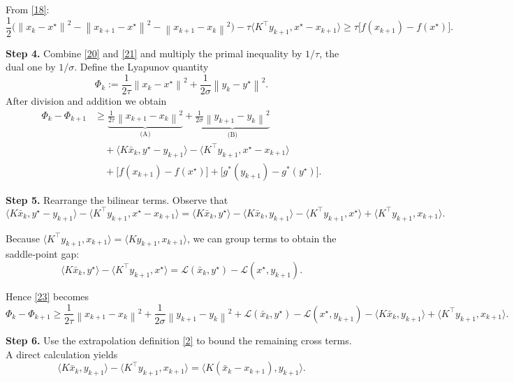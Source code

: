 \documentclass{article}
\newcommand{\inner}[2]{\langle #1,#2\rangle}
\newcommand{\norm}[1]{\left\|#1\right\|}
\begin{document}
From \eqref{18}:
\[
\frac{1}{2}\bigl(\norm{x_{k}-x^{\star}}^{2}
-\norm{x_{k+1}-x^{\star}}^{2}
-\norm{x_{k+1}-x_{k}}^{2}\bigr)
- \tau\inner{K^{\top}y_{k+1}}{x^{\star}-x_{k+1}}
\ge \tau\bigl[f(x_{k+1})-f(x^{\star})\bigr].
\tag{21}
\]

\medskip

\noindent\textbf{Step 4.}  Combine \eqref{20} and \eqref{21} and multiply the primal inequality by $1/\tau$, the dual one by $1/\sigma$.
Define the Lyapunov quantity
\[
\Phi_{k}:=\frac{1}{2\tau}\norm{x_{k}-x^{\star}}^{2}
+\frac{1}{2\sigma}\norm{y_{k}-y^{\star}}^{2}.
\tag{22}
\]
After division and addition we obtain
\[
\begin{aligned}
\Phi_{k}-\Phi_{k+1}
&\ge
\underbrace{\frac{1}{2\tau}\norm{x_{k+1}-x_{k}}^{2}}_{\text{(A)}}
+\underbrace{\frac{1}{2\sigma}\norm{y_{k+1}-y_{k}}^{2}}_{\text{(B)}}
\\
&\quad
+\inner{K\bar{x}_{k}}{y^{\star}-y_{k+1}}
-\inner{K^{\top}y_{k+1}}{x^{\star}-x_{k+1}}
\\
&\quad
+ \bigl[f(x_{k+1})-f(x^{\star})\bigr]
+ \bigl[g^{*}(y_{k+1})-g^{*}(y^{\star})\bigr].
\end{aligned}
\tag{23}
\]

\medskip

\noindent\textbf{Step 5.}  Rearrange the bilinear terms.
Observe that
\[
\inner{K\bar{x}_{k}}{y^{\star}-y_{k+1}}
-\inner{K^{\top}y_{k+1}}{x^{\star}-x_{k+1}}
= \inner{K\bar{x}_{k}}{y^{\star}}-\inner{K\bar{x}_{k}}{y_{k+1}}
-\inner{K^{\top}y_{k+1}}{x^{\star}}+\inner{K^{\top}y_{k+1}}{x_{k+1}}.
\tag{24}
\]

Because $\inner{K^{\top}y_{k+1}}{x_{k+1}}=\inner{Ky_{k+1}}{x_{k+1}}$, we can group terms to obtain the saddle‑point gap:
\[
\inner{K\bar{x}_{k}}{y^{\star}}-\inner{K^{\top}y_{k+1}}{x^{\star}}=
\mathcal{L}(\bar{x}_{k},y^{\star})-\mathcal{L}(x^{\star},y_{k+1}).
\tag{25}
\]

Hence \eqref{23} becomes
\[
\Phi_{k}-\Phi_{k+1}
\ge
\frac{1}{2\tau}\norm{x_{k+1}-x_{k}}^{2}
+\frac{1}{2\sigma}\norm{y_{k+1}-y_{k}}^{2}
+\mathcal{L}(\bar{x}_{k},y^{\star})-\mathcal{L}(x^{\star},y_{k+1})
-\inner{K\bar{x}_{k}}{y_{k+1}}+\inner{K^{\top}y_{k+1}}{x_{k+1}} .
\tag{26}
\]

\medskip

\noindent\textbf{Step 6.}  Use the extrapolation definition \eqref{2} to bound the remaining cross terms.
A direct calculation yields
\[
\inner{K\bar{x}_{k}}{y_{k+1}}-\inner{K^{\top}y_{k+1}}{x_{k+1}}
= \inner{K(\bar{x}_{k}-x_{k+1})}{y_{k+1}}.
\tag{27}
\]
\end{document}
